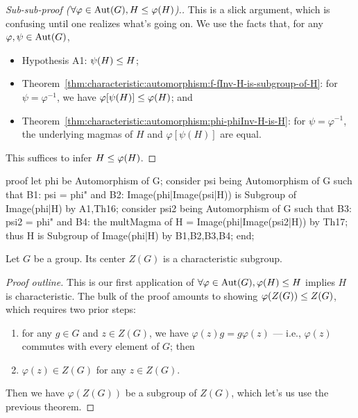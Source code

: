 \begin{proof}[Sub-sub-proof ($\forall\varphi\in\operatorname{Aut}(G),H\leq\varphi(H)$).]
This is a slick argument, which is confusing until one realizes
what's going on.  We use the facts that, for any $\varphi,\psi\in\operatorname{Aut}(G)$,
\begin{itemize}
\item Hypothesis {\Tt{}A1\nwendquote}: $\psi(H)\leq H$;
\item Theorem~\ref{thm:characteristic:automorphism:f-fInv-H-is-subgroup-of-H}: for $\psi=\varphi^{-1}$, we have $\varphi[\psi(H)]\leq\varphi(H)$; and
\item Theorem~\ref{thm:characteristic:automorphism:phi-phiInv-H-is-H}: for $\psi=\varphi^{-1}$, the underlying magmas of $H$ and $\varphi[\psi(H)]$ are equal.
\end{itemize}
This suffices to infer $H\leq\varphi(H)$.
\end{proof}

\nwenddocs{}\endmoddef\nwstartdeflinemarkup{}\nwenddeflinemarkup
proof
  let phi be Automorphism of G;
  consider psi being Automorphism of G such that
  B1: psi = phi" and
  B2: Image(phi|Image(psi|H)) is Subgroup of Image(phi|H) by A1,Th16;
  consider psi2 being Automorphism of G such that
  B3: psi2 = phi" and
  B4: the multMagma of H = Image(phi|Image(psi2|H)) by Th17;
  thus H is Subgroup of Image(phi|H) by B1,B2,B3,B4;
end;
\nwendcode{}\nwdocspar


\begin{theorem}
Let $G$ be a group. Its center $Z(G)$ is a characteristic subgroup.
\end{theorem}

\begin{proof}[Proof outline]
This is our first application of
$\forall\varphi\in\operatorname{Aut}(G),\varphi(H)\leq H$ implies $H$ is characteristic.
The bulk of the proof amounts to showing $\varphi(Z(G))\leq Z(G)$,
which requires two prior steps:
\begin{enumerate}
\item for any $g\in G$ and $z\in Z(G)$, we have $\varphi(z)g =
  g\varphi(z)$ --- i.e., $\varphi(z)$ commutes with every element of
  $G$; then
\item $\varphi(z)\in Z(G)$ for any $z\in Z(G)$.
\end{enumerate}
Then we have $\varphi(Z(G))$ be a subgroup of $Z(G)$, which let's us use
the previous theorem.
\end{proof}

